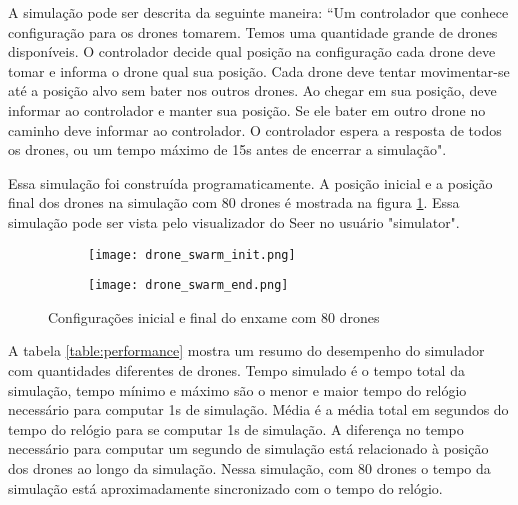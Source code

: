 A simulação pode ser descrita da seguinte maneira: “Um controlador que conhece configuração para os drones tomarem. Temos uma quantidade grande de drones disponíveis. O controlador decide qual posição na configuração cada drone deve tomar e informa o drone qual sua posição. Cada drone deve tentar movimentar-se até a posição alvo sem bater nos outros drones. Ao chegar em sua posição, deve informar ao controlador e manter sua posição. Se ele bater em outro drone no caminho deve informar ao controlador. O controlador espera a resposta de todos os drones, ou um tempo máximo de 15s antes de encerrar a simulação".

Essa simulação foi construída programaticamente. A posição inicial e a posição final dos drones na simulação com 80 drones é mostrada na figura \ref{fig:drone_swarm}. Essa simulação pode ser vista pelo visualizador do Seer no usuário "simulator".

\begin{figure}
    \centering
    \begin{subfigure}[b]{0.4\textwidth}
        \centering
        \texttt{[image: drone\_swarm\_init.png]}
    \end{subfigure}
    \hfill
    \begin{subfigure}[b]{0.4\textwidth}
        \centering
        \texttt{[image: drone\_swarm\_end.png]}
    \end{subfigure}
    \caption{Configurações inicial e final do enxame com 80 drones}
    \label{fig:drone_swarm}
\end{figure}

A tabela \ref{table:performance} mostra um resumo do desempenho do simulador com quantidades diferentes de drones. Tempo simulado é o tempo total da simulação, tempo mínimo e máximo são o menor e maior tempo do relógio necessário para computar 1s de simulação. Média é a média total em segundos do tempo do relógio para se computar 1s de simulação. A diferença no tempo necessário para computar um segundo de simulação está relacionado à posição dos drones ao longo da simulação. Nessa simulação, com 80 drones o tempo da simulação está aproximadamente sincronizado com o tempo do relógio.

